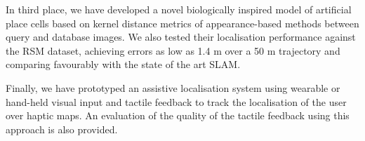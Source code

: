 In third place, we have developed a novel biologically inspired model of artificial place cells based on kernel distance metrics of appearance-based methods between query and database images. We also tested their localisation performance against the RSM dataset, achieving errors as low as 1.4 m over a 50 m trajectory and comparing favourably with the state of the art SLAM. 

Finally, we have prototyped an assistive localisation system using wearable or hand-held visual input and tactile feedback to track the localisation of the user over haptic maps. An evaluation of the quality of the tactile feedback using this approach is also provided.


\vfill



\endgroup			

\vfill